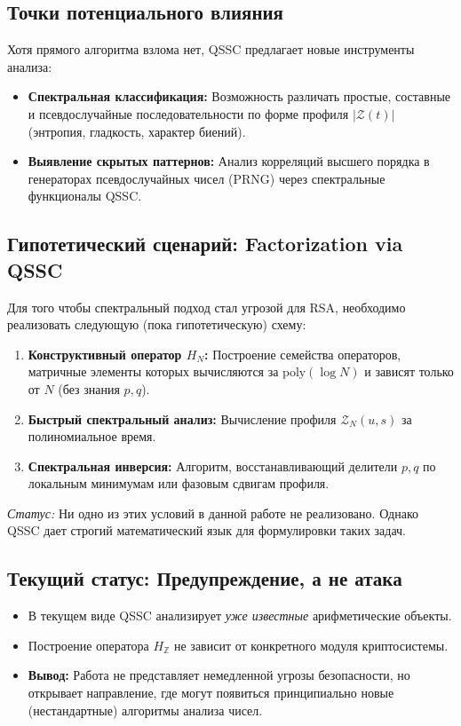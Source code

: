 \documentclass{article}
\numberwithin{equation}{section}
\theoremstyle{plain}
\theoremstyle{definition}
\theoremstyle{remark}
\begin{document}
\subsection*{Точки потенциального влияния}
Хотя прямого алгоритма взлома нет, QSSC предлагает новые инструменты анализа:
\begin{itemize}
    \item \textbf{Спектральная классификация:} Возможность различать простые, составные и псевдослучайные последовательности по форме профиля $|\mathcal{Z}(t)|$ (энтропия, гладкость, характер биений).
    \item \textbf{Выявление скрытых паттернов:} Анализ корреляций высшего порядка в генераторах псевдослучайных чисел (PRNG) через спектральные функционалы QSSC.
\end{itemize}

\subsection*{Гипотетический сценарий: Factorization via QSSC}
Для того чтобы спектральный подход стал угрозой для RSA, необходимо реализовать следующую (пока гипотетическую) схему:
\begin{enumerate}
    \item \textbf{Конструктивный оператор $H_N$:} Построение семейства операторов, матричные элементы которых вычисляются за $\text{poly}(\log N)$ и зависят только от $N$ (без знания $p, q$).
    \item \textbf{Быстрый спектральный анализ:} Вычисление профиля $\mathcal{Z}_N(u,s)$ за полиномиальное время.
    \item \textbf{Спектральная инверсия:} Алгоритм, восстанавливающий делители $p, q$ по локальным минимумам или фазовым сдвигам профиля.
\end{enumerate}
\textit{Статус:} Ни одно из этих условий в данной работе не реализовано. Однако QSSC дает строгий математический язык для формулировки таких задач.

\subsection*{Текущий статус: Предупреждение, а не атака}
\begin{itemize}
    \item В текущем виде QSSC анализирует \textit{уже известные} арифметические объекты.
    \item Построение оператора $H_{\mathbb{Z}}$ не зависит от конкретного модуля криптосистемы.
    \item \textbf{Вывод:} Работа не представляет немедленной угрозы безопасности, но открывает направление, где могут появиться принципиально новые (нестандартные) алгоритмы анализа чисел.
\end{itemize}
\end{document}
